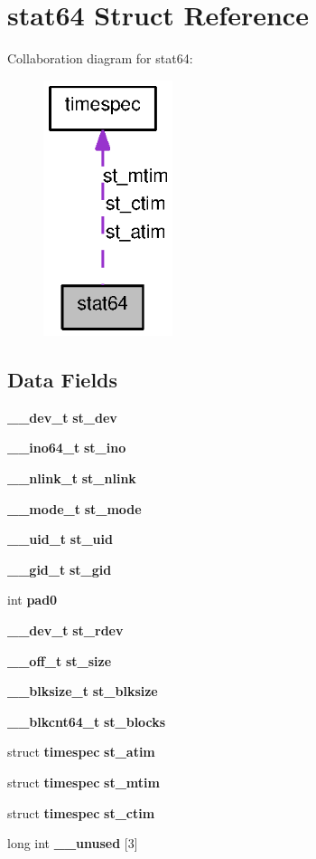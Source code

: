 \section{stat64 Struct Reference}
\label{structstat64}


Collaboration diagram for stat64:
\nopagebreak
\begin{figure}[H]
\begin{center}
\leavevmode
\includegraphics[width=107pt]{structstat64__coll__graph}
\end{center}
\end{figure}
\subsection*{Data Fields}
\begin{DoxyCompactItemize}
\item 
{\bf \_\-\_\-dev\_\-t} {\bf st\_\-dev}
\item 
{\bf \_\-\_\-ino64\_\-t} {\bf st\_\-ino}
\item 
{\bf \_\-\_\-nlink\_\-t} {\bf st\_\-nlink}
\item 
{\bf \_\-\_\-mode\_\-t} {\bf st\_\-mode}
\item 
{\bf \_\-\_\-uid\_\-t} {\bf st\_\-uid}
\item 
{\bf \_\-\_\-gid\_\-t} {\bf st\_\-gid}
\item 
int {\bf pad0}
\item 
{\bf \_\-\_\-dev\_\-t} {\bf st\_\-rdev}
\item 
{\bf \_\-\_\-off\_\-t} {\bf st\_\-size}
\item 
{\bf \_\-\_\-blksize\_\-t} {\bf st\_\-blksize}
\item 
{\bf \_\-\_\-blkcnt64\_\-t} {\bf st\_\-blocks}
\item 
struct {\bf timespec} {\bf st\_\-atim}
\item 
struct {\bf timespec} {\bf st\_\-mtim}
\item 
struct {\bf timespec} {\bf st\_\-ctim}
\item 
long int {\bf \_\-\_\-unused} [3]
\end{DoxyCompactItemize}


